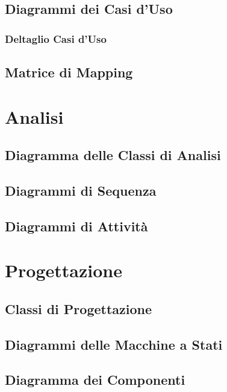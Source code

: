 \documentclass[12pt,a4paper]{report}
\begin{document}
\section{Diagrammi dei Casi d'Uso}

\subsection{Deltaglio Casi d'Uso}

\section{Matrice di Mapping}

\chapter{Analisi}
\label{ch:analisi}

\section{Diagramma delle Classi di Analisi}

\section{Diagrammi di Sequenza}

\section{Diagrammi di Attivit\`a}

\chapter{Progettazione}
\label{ch:progettazione}

\section{Classi di Progettazione}

\section{Diagrammi delle Macchine a Stati}

\section{Diagramma dei Componenti}
\end{document}
